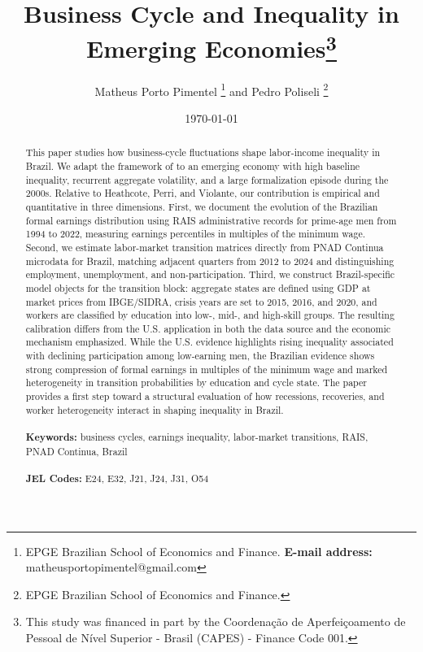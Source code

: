 \documentclass[12pt]{article}
\newcommand{\citeonline}[1]{\citet{#1}}
\begin{document}
	
	\begin{titlepage}
		\title{Business Cycle and Inequality in Emerging Economies\thanks{This
				study was financed in part by the Coordenação de Aperfeiçoamento de Pessoal de Nível Superior - Brasil
				(CAPES) - Finance Code 001.}}
		\author{Matheus Porto Pimentel  \thanks{EPGE Brazilian School of Economics and Finance.
				\textbf{E-mail address:} matheusportopimentel@gmail.com} and Pedro Poliseli \thanks{EPGE Brazilian School of Economics and Finance.}}
		\date{\today}
		\maketitle
		\begin{abstract}
			\noindent 
			This paper studies how business-cycle fluctuations shape labor-income inequality in Brazil. We adapt the framework of \citeonline{heathcote2020rise} to an emerging economy with high baseline inequality, recurrent aggregate volatility, and a large formalization episode during the 2000s. Relative to Heathcote, Perri, and Violante, our contribution is empirical and quantitative in three dimensions. First, we document the evolution of the Brazilian formal earnings distribution using RAIS administrative records for prime-age men from 1994 to 2022, measuring earnings percentiles in multiples of the minimum wage. Second, we estimate labor-market transition matrices directly from PNAD Continua microdata for Brazil, matching adjacent quarters from 2012 to 2024 and distinguishing employment, unemployment, and non-participation. Third, we construct Brazil-specific model objects for the transition block: aggregate states are defined using GDP at market prices from IBGE/SIDRA, crisis years are set to 2015, 2016, and 2020, and workers are classified by education into low-, mid-, and high-skill groups. The resulting calibration differs from the U.S. application in both the data source and the economic mechanism emphasized. While the U.S. evidence highlights rising inequality associated with declining participation among low-earning men, the Brazilian evidence shows strong compression of formal earnings in multiples of the minimum wage and marked heterogeneity in transition probabilities by education and cycle state. The paper provides a first step toward a structural evaluation of how recessions, recoveries, and worker heterogeneity interact in shaping inequality in Brazil.
			\\
			\vspace{0in}\\
			\noindent\textbf{Keywords:} business cycles, earnings inequality, labor-market transitions, RAIS,\\ PNAD Continua, Brazil\\
			\vspace{0in}\\
			\noindent\textbf{JEL Codes:} E24, E32, J21, J24, J31, O54\\
			
			\bigskip
		\end{abstract}
		\setcounter{page}{0}
		\thispagestyle{empty}
	\end{titlepage}
	\pagebreak \newpage
	
\end{document}
